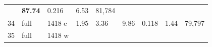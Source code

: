 \documentclass[
  10pt, ]{article}
\begin{document}
\begin{longtable}[]{@{}lllllllll@{}}
\begin{minipage}[t]{0.08\columnwidth}
\end{minipage} & \begin{minipage}[t]{0.08\columnwidth}\raggedright
\textbf{87.74}\strut
\end{minipage} & \begin{minipage}[t]{0.08\columnwidth}\raggedright
0.216\strut
\end{minipage} & \begin{minipage}[t]{0.08\columnwidth}\raggedright
6.53\strut
\end{minipage} & \begin{minipage}[t]{0.08\columnwidth}\raggedright
81,784\strut
\end{minipage}\tabularnewline
\begin{minipage}[t]{0.08\columnwidth}\raggedright
34\strut
\end{minipage} & \begin{minipage}[t]{0.08\columnwidth}\raggedright
full\strut
\end{minipage} & \begin{minipage}[t]{0.08\columnwidth}\raggedright
1418 e\strut
\end{minipage} & \begin{minipage}[t]{0.08\columnwidth}\raggedright
1.95\strut
\end{minipage} & \begin{minipage}[t]{0.08\columnwidth}\raggedright
3.36\strut
\end{minipage} & \begin{minipage}[t]{0.08\columnwidth}\raggedright
9.86\strut
\end{minipage} & \begin{minipage}[t]{0.08\columnwidth}\raggedright
0.118\strut
\end{minipage} & \begin{minipage}[t]{0.08\columnwidth}\raggedright
1.44\strut
\end{minipage} & \begin{minipage}[t]{0.08\columnwidth}\raggedright
79,797\strut
\end{minipage}\tabularnewline
\begin{minipage}[t]{0.08\columnwidth}\raggedright
35\strut
\end{minipage} & \begin{minipage}[t]{0.08\columnwidth}\raggedright
full\strut
\end{minipage} & \begin{minipage}[t]{0.08\columnwidth}\raggedright
1418 w\strut
\end{minipage} & \begin{minipage}[t]{0.08\columnwidth}\raggedright

\end{minipage}
\end{longtable}
\end{document}
